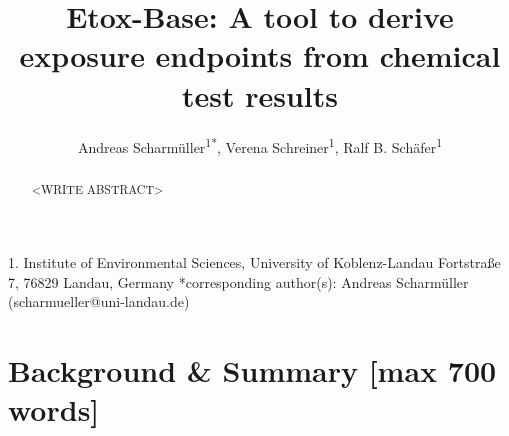 \documentclass[english]{article}
\begin{document}
\title{Etox-Base: A tool to derive exposure endpoints from chemical test results}

\author{Andreas Scharm{\"u}ller\textsuperscript{1{*}},
        Verena Schreiner\textsuperscript{1},
        Ralf B. Sch{\"a}fer\textsuperscript{1}}

\maketitle
\thispagestyle{fancy}

1. Institute of Environmental Sciences, University of Koblenz-Landau Fortstraße 7, 76829 Landau, Germany {*}corresponding author(s):
Andreas Scharm{\"u}ller (scharmueller@uni-landau.de)

\begin{abstract}

<WRITE ABSTRACT>

\end{abstract}

\section*{Background \& Summary [max 700 words]}
\end{document}
